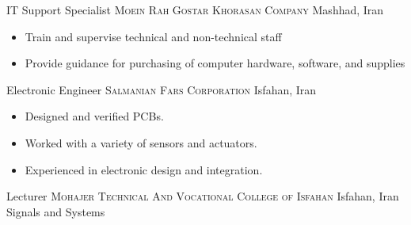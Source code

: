 {IT Support Specialist}
{\textsc{Moein Rah Gostar Khorasan Company}}
{Mashhad, Iran}
{}
{
\begin{itemize}
    \item Train and supervise technical and non-technical staff
    \item Provide guidance for purchasing of computer hardware, software, and supplies 
\end{itemize}
}


{Electronic Engineer}
{\textsc{Salmanian Fars Corporation}}
{Isfahan, Iran}
{}
{
\begin{itemize} 
    \item Designed and verified PCBs.
    \item Worked with a variety of sensors and actuators.
    \item Experienced in electronic design and integration.
\end{itemize}
}

{Lecturer}
{\textsc{Mohajer Technical And Vocational College of Isfahan}}
{Isfahan, Iran}
{}
{
Signals and Systems
}
